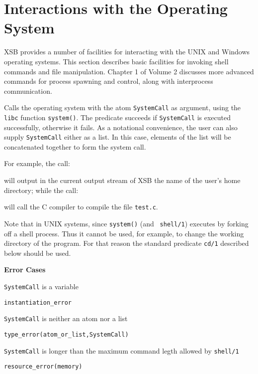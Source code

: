
\section{Interactions with the Operating System}

XSB provides a number of facilities for interacting with the UNIX and
Windows operating systems.  This section describes basic facilities
for invoking shell commands and file manipulation.  Chapter 1 of
Volume 2 discusses more advanced commands for process spawning and
control, along with interprocess communication.

\begin{description}

%
Calls the operating system with the atom {\tt SystemCall} as argument,
using the {\tt libc} function {\tt system()}.  The predicate succeeds
if {\tt SystemCall} is executed successfully, otherwise it fails.  As
a notational convenience, the user can also supply {\tt SystemCall}
either as a list.  In this case, elements of the list will be
concatenated together to form the system call.

    For example, the call:


    \noindent
    will output in the current output stream of XSB the name of the
    user's home directory; while the call:


    \noindent
    will call the C compiler to compile the file {\tt test.c}.

    Note that in UNIX systems, since {\tt system()} (and {\tt
      shell/1}) executes by forking off a shell process.  Thus it
    cannot be used, for example, to change the working directory of
    the program.  For that reason the standard predicate {\tt cd/1}
    described below should be used.

{\bf Error Cases}
\bi
\item  {\tt SystemCall} is a variable
\bi
\item {\tt instantiation\_error}
\ei
\item {\tt SystemCall} is neither an atom nor a list
\bi
\item {\tt type\_error(atom\_or\_list,SystemCall)}
\ei
\item {\tt SystemCall} is longer than the maximum command legth
  allowed by {\tt shell/1}
\bi
\item {\tt resource\_error(memory)}
\ei
\ei


\end{description}
